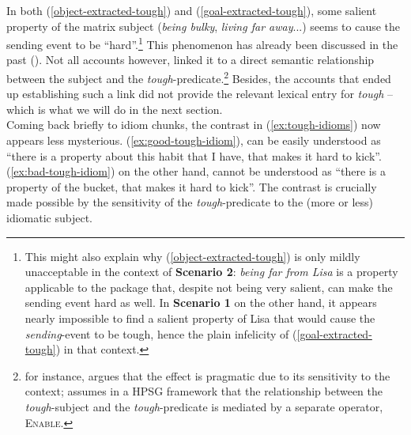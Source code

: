 \documentclass[11pt]{article}
\begin{document}
In both (\ref{object-extracted-tough}) and
(\ref{goal-extracted-tough}), some salient property of the matrix subject (\textit{being bulky}, \textit{living far away}...) seems to cause the sending event to be ``hard''.\footnote{This might also explain why (\ref{object-extracted-tough}) is only mildly unacceptable in the context of \textbf{Scenario 2}: \textit{being far from Lisa} is a property applicable to the package that, despite not being	very salient, can make the sending event hard as well. In \textbf{Scenario 1} on the other hand, it appears nearly impossible to find a salient property of Lisa that would cause the \textit{sending}-event to be tough, hence the plain infelicity of (\ref{goal-extracted-tough}) in that context.} This phenomenon has already been discussed in the past (\cite{Bayer1990,Goh2000b,Grover1995,Hukari1990,Kim1995,Schachter1981}). Not all accounts however, linked it to a direct semantic relationship between the subject and the \textit{tough}-predicate.\footnote{\cite{Goh2000b} for instance, argues that the effect is pragmatic due to its sensitivity to the context; \cite{Grover1995} assumes in a HPSG framework that the relationship between the \textit{tough}-subject and the \textit{tough}-predicate is mediated by a separate operator, \textsc{Enable}.} Besides, the accounts that ended up establishing such a link did not provide the relevant lexical entry for \textit{tough} -- which is what we will do in the next section.\\

Coming back briefly to idiom chunks, the contrast in (\ref{ex:tough-idioms}) now appears less mysterious. (\ref{ex:good-tough-idiom}), can be easily understood as ``there is a property about this habit that I have, that makes it hard to kick''. (\ref{ex:bad-tough-idiom}) on the other hand, cannot be understood as ``there is a property of the bucket, that makes it hard to kick''. The contrast is crucially made possible by the sensitivity of the \textit{tough}-predicate to the (more or less) idiomatic subject. 
\end{document}

